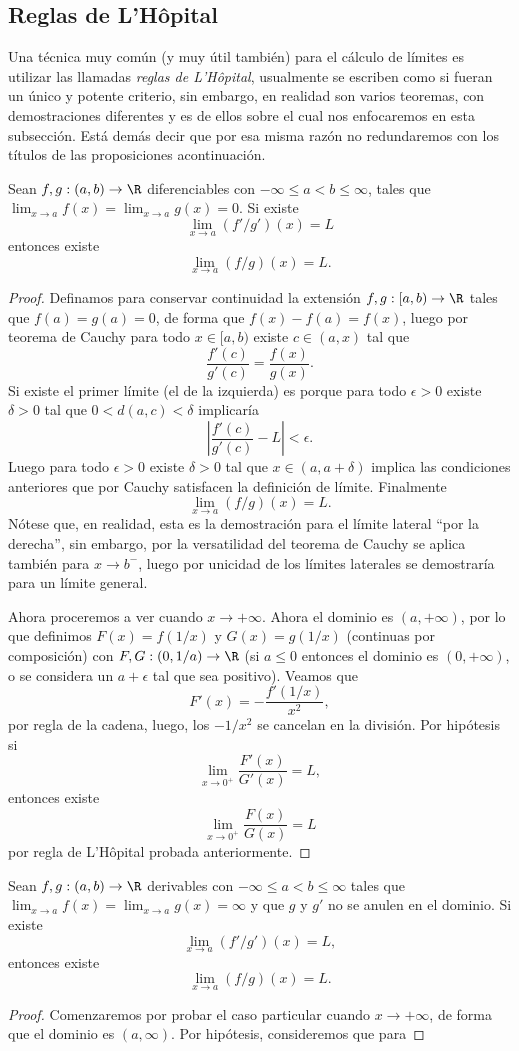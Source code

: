 \documentclass[11pt,oneside,a4paper]{book}
\begin{document}
\subsection*{Reglas de L'Hôpital}
Una técnica muy común (y muy útil también) para el cálculo de límites es utilizar las llamadas \textit{reglas de L'Hôpital}, usualmente se escriben como si fueran un único y potente criterio, sin embargo, en realidad son varios teoremas, con demostraciones diferentes y es de ellos sobre el cual nos enfocaremos en esta subsección. Está demás decir que por esa misma razón no redundaremos con los títulos de las proposiciones acontinuación.
\begin{thm}
Sean $f,g:(a,b)\rightarrow\R$ diferenciables con $-\infty\leq a\lt b\leq\infty$, tales que $\lim_{x\to a}f(x)=\lim_{x\to a}g(x)=0$. Si existe
$$\lim_{x\to a}(f'/g')(x)=L$$
entonces existe
$$\lim_{x\to a}(f/g)(x)=L.$$
\end{thm}
\begin{proof}
Definamos para conservar continuidad la extensión $f,g:[a,b)\rightarrow\R$ tales que $f(a)=g(a)=0$, de forma que $f(x)-f(a)=f(x)$, luego por teorema de Cauchy para todo $x\in[a,b)$ existe $c\in(a,x)$ tal que
$$\frac{f'(c)}{g'(c)}=\frac{f(x)}{g(x)}.$$
Si existe el primer límite (el de la izquierda) es porque para todo $\epsilon\gt 0$ existe $\delta\gt 0$ tal que $0\lt d(a,c)\lt\delta$ implicaría
$$\left|\frac{f'(c)}{g'(c)}-L\right|\lt\epsilon.$$
Luego para todo $\epsilon\gt 0$ existe $\delta\gt 0$ tal que $x\in(a,a+\delta)$ implica las condiciones anteriores que por Cauchy satisfacen la definición de límite. Finalmente
$$\lim_{x\to a} (f/g)(x)=L.$$
Nótese que, en realidad, esta es la demostración para el límite lateral ``por la derecha'', sin embargo, por la versatilidad del teorema de Cauchy se aplica también para $x\to b^-$, luego por unicidad de los límites laterales se demostraría para un límite general.

Ahora proceremos a ver cuando $x\to+\infty$. Ahora el dominio es $(a,+\infty)$, por lo que definimos $F(x)=f(1/x)$ y $G(x)=g(1/x)$ (continuas por composición) con $F,G:(0,1/a)\rightarrow\R$ (si $a\leq 0$ entonces el dominio es $(0,+\infty)$, o se considera un $a+\epsilon$ tal que sea positivo). Veamos que
$$F'(x)=-\frac{f'(1/x)}{x^2},$$
por regla de la cadena, luego, los $-1/x^2$ se cancelan en la división. Por hipótesis si
$$\lim_{x\to 0^+}\frac{F'(x)}{G'(x)}=L,$$
entonces existe
$$\lim_{x\to 0^+}\frac{F(x)}{G(x)}=L$$
por regla de L'Hôpital probada anteriormente.
\end{proof}
\begin{thm}
Sean $f,g:(a,b)\rightarrow\R$ derivables con $-\infty\leq a\lt b\leq\infty$ tales que $\lim_{x\to a}f(x)=\lim_{x\to a}g(x)=\infty$ y que $g$ y $g'$ no se anulen en el dominio. Si existe
$$\lim_{x\to a} (f'/g')(x)=L,$$
entonces existe
$$\lim_{x\to a} (f/g)(x)=L.$$
\end{thm}
\begin{proof}
Comenzaremos por probar el caso particular cuando $x\to+\infty$, de forma que el dominio es $(a,\infty)$. Por hipótesis, consideremos que para 
\end{proof}
\end{document}
